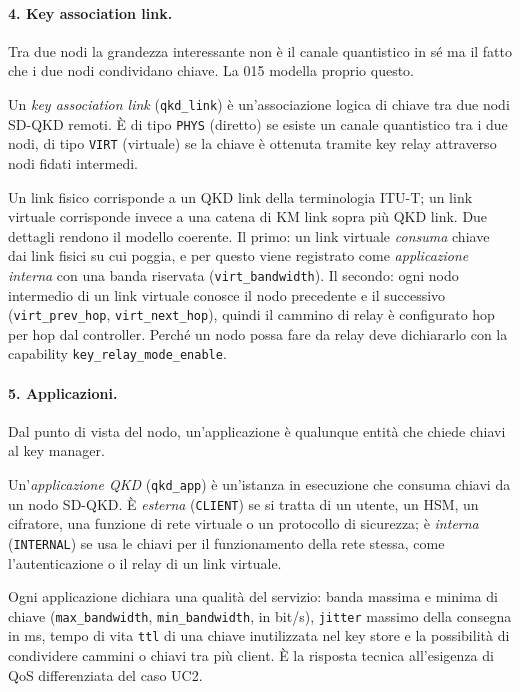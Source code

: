 

\paragraph{4. Key association link.}
Tra due nodi la grandezza interessante non è il canale quantistico in sé
ma il fatto che i due nodi condividano chiave. La 015 modella proprio
questo.

\begin{definition}
Un \emph{key association link} (\texttt{qkd\_link}) è un'associazione
logica di chiave tra due nodi SD-QKD remoti. È di tipo \texttt{PHYS}
(diretto) se esiste un canale quantistico tra i due nodi, di tipo
\texttt{VIRT} (virtuale) se la chiave è ottenuta tramite key relay
attraverso nodi fidati intermedi.
\end{definition}

Un link fisico corrisponde a un QKD link della terminologia ITU-T; un link
virtuale corrisponde invece a una catena di KM link sopra più QKD link. Due
dettagli rendono il modello coerente. Il primo: un link virtuale
\emph{consuma} chiave dai link fisici su cui poggia, e per questo viene
registrato come \emph{applicazione interna} con una banda riservata
(\texttt{virt\_bandwidth}). Il secondo: ogni nodo intermedio di un link
virtuale conosce il nodo precedente e il successivo
(\texttt{virt\_prev\_hop}, \texttt{virt\_next\_hop}), quindi il cammino di
relay è configurato hop per hop dal controller. Perché un nodo possa fare
da relay deve dichiararlo con la capability
\texttt{key\_relay\_mode\_enable}.

\paragraph{5. Applicazioni.}
Dal punto di vista del nodo, un'applicazione è qualunque entità che chiede
chiavi al key manager.

\begin{definition}
Un'\emph{applicazione QKD} (\texttt{qkd\_app}) è un'istanza in esecuzione
che consuma chiavi da un nodo SD-QKD. È \emph{esterna}
(\texttt{CLIENT}) se si tratta di un utente, un HSM, un cifratore, una
funzione di rete virtuale o un protocollo di sicurezza; è \emph{interna}
(\texttt{INTERNAL}) se usa le chiavi per il funzionamento della rete
stessa, come l'autenticazione o il relay di un link virtuale.
\end{definition}

Ogni applicazione dichiara una qualità del servizio: banda massima e
minima di chiave (\texttt{max\_bandwidth}, \texttt{min\_bandwidth}, in
bit/s), \texttt{jitter} massimo della consegna in ms, tempo di vita
\texttt{ttl} di una chiave inutilizzata nel key store e la possibilità di
condividere cammini o chiavi tra più client. È la risposta tecnica
all'esigenza di QoS differenziata del caso UC2.

